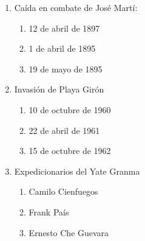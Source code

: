 \documentclass[twocolumn]{article}
\begin{document}
\begin{enumerate}



  \item Caída en combate de José Martí:

  \begin{enumerate}
   
   \item 12 de abril de 1897
   
   \item 1 de abril de 1895
   
   \item 19 de mayo de 1895
   
  \end{enumerate}



  \item Invasión de Playa Girón

  \begin{enumerate}
   
   \item 10 de octubre de 1960
   
   \item 22 de abril de 1961
   
   \item 15 de octubre de 1962
   
  \end{enumerate}



  \item Expedicionarios del Yate Granma

  \begin{enumerate}
   
   \item Camilo Cienfuegos
   
   \item Frank País
   
   \item Ernesto Che Guevara
   
  \end{enumerate}




\end{enumerate}
\end{document}
